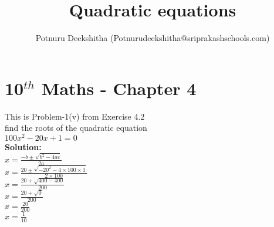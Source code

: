 \documentclass[12pt]{article}
\title{Quadratic equations}
\author{Potnuru Deekshitha (Potnurudeekshitha@sriprakashschools.com)}
\newcommand{\solution}{\noindent \textbf{Solution: }}
\begin{document}
\section*{10$^{th}$ Maths - Chapter 4}
This is Problem-1(v) from Exercise 4.2\\
find the roots of the quadratic equation\\
${100}x^2-{20} x +{1} = 0$\\
\solution\\
$x=\frac{-b\pm\sqrt{b^2-4ac}}{2a}$\\
$x=\frac{20\pm\sqrt{-20^2-4 \times 100\times1}}{2 \times 100}$\\
$x=\frac{20+\sqrt{400-400}}{200}$\\
$x=\frac{20+\sqrt{0}}{200}$\\
$x=\frac{20}{200}$\\
$x=\frac{1}{10}$\\
\end{document}
